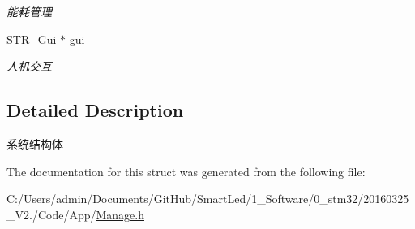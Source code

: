 \begin{DoxyCompactItemize}
\begin{DoxyCompactList}\small\item\em 能耗管理 \end{DoxyCompactList}\item 
\hypertarget{struct_s_t_r___sys_a2d54de2609e10c374b86ee87c1212b09}{\hyperlink{struct_s_t_r___gui}{\-S\-T\-R\-\_\-\-Gui} $\ast$ \hyperlink{struct_s_t_r___sys_a2d54de2609e10c374b86ee87c1212b09}{gui}}\label{struct_s_t_r___sys_a2d54de2609e10c374b86ee87c1212b09}

\begin{DoxyCompactList}\small\item\em 人机交互 \end{DoxyCompactList}\end{DoxyCompactItemize}


\subsection{\-Detailed \-Description}
系统结构体 

\-The documentation for this struct was generated from the following file\-:\begin{DoxyCompactItemize}
\item 
\-C\-:/\-Users/admin/\-Documents/\-Git\-Hub/\-Smart\-Led/1\-\_\-\-Software/0\-\_\-stm32/20160325\-\_\-\-V2./\-Code/\-App/\hyperlink{_manage_8h}{\-Manage.\-h}\end{DoxyCompactItemize}
